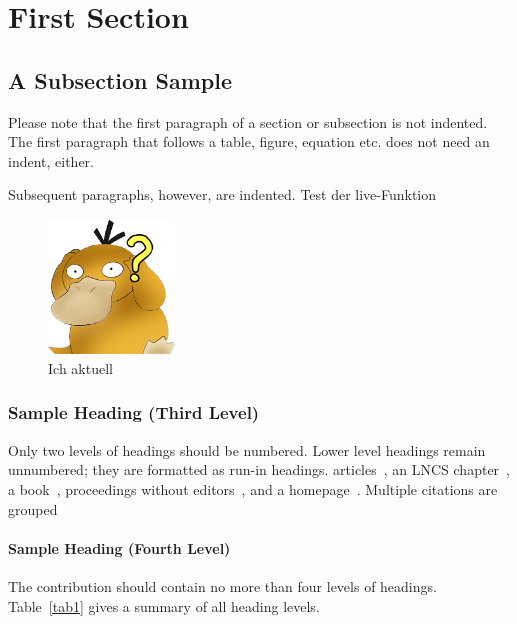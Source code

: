 \section{First Section}
\subsection{A Subsection Sample}
Please note that the first paragraph of a section or subsection is
not indented. The first paragraph that follows a table, figure,
equation etc. does not need an indent, either.

Subsequent paragraphs, however, are indented. Test der live-Funktion
\begin{figure}[ht]
    \begin{center}
        \includegraphics[width = 0.3\textwidth]{Bilder/enton.png}
        \caption{Ich aktuell}
    \end{center}
\end{figure}

\subsubsection{Sample Heading (Third Level)} Only two levels of
headings should be numbered. Lower level headings remain unnumbered;
they are formatted as run-in headings.
articles~\cite{ref_article1}, an LNCS chapter~\cite{ref_lncs1}, a
book~\cite{ref_book1}, proceedings without editors~\cite{ref_proc1},
and a homepage~\cite{ref_url1}. Multiple citations are grouped

\paragraph{Sample Heading (Fourth Level)}
The contribution should contain no more than four levels of
headings. Table~\ref{tab1} gives a summary of all heading levels.

